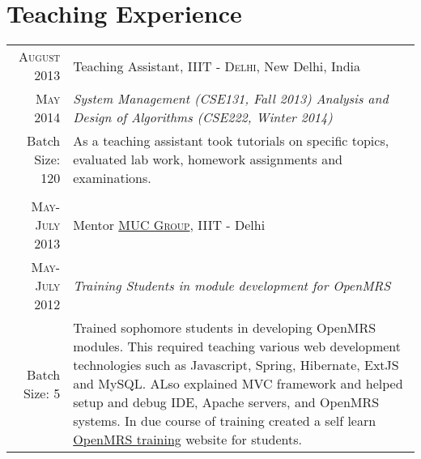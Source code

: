 \documentclass[a4paper,10pt]{article} %
\begin{document}

\section{\color{red} Teaching Experience}

\begin{tabular}{r|p{13cm}}

\textsc{August 2013 } & Teaching Assistant, \textsc{ IIIT - Delhi}, New Delhi, India \\
\textsc{May 2014} & \emph{System Management (CSE131, Fall 2013) \newline Analysis and Design of Algorithms (CSE222, Winter 2014)}\\ 
Batch Size: 120 & \small{As a teaching assistant took tutorials on specific topics, evaluated lab work, homework \newline assignments and examinations.}\\
\multicolumn{2}{c}{} \\

\textsc{May-July 2013} & Mentor \href{http://muc.iiitd.edu.in/muc/}{\textsc{MUC Group}}, IIIT - Delhi \emph{}\\
\textsc{May-July 2012} & \emph{Training Students in module development for OpenMRS}\\ 
Batch Size: 5& \small{Trained sophomore students in developing OpenMRS modules. This required teaching various web development technologies such as Javascript, Spring, Hibernate, ExtJS and MySQL. ALso explained  MVC framework and helped setup and debug IDE, Apache servers, and OpenMRS systems. In due course of training created a self learn \href{https://sites.google.com/a/iiitd.ac.in/openmrs-iiitd/}{OpenMRS training} website for students.}


\end{tabular}



\end{document}
